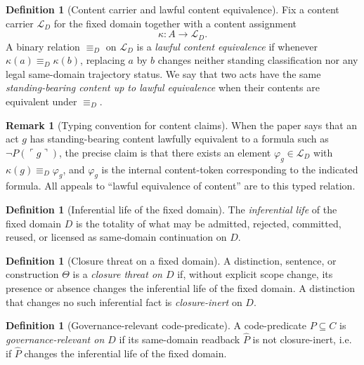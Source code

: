 \documentclass[11pt]{article}
\theoremstyle{plain}
\theoremstyle{definition}
\newtheorem{definition}[theorem]{Definition}
\newtheorem{remark}[theorem]{Remark}
\newcommand{\code}[1]{\ulcorner #1 \urcorner}
\newcommand{\domain}{D}
\begin{document}
\begin{definition}[Content carrier and lawful content equivalence]
Fix a content carrier $\mathcal{L}_{\domain}$ for the fixed domain together with a content assignment
\[
\kappa:A\to \mathcal{L}_{\domain}.
\]
A binary relation $\equiv_{\domain}$ on $\mathcal{L}_{\domain}$ is a \emph{lawful content equivalence} if whenever $\kappa(a)\equiv_{\domain}\kappa(b)$, replacing $a$ by $b$ changes neither standing classification nor any legal same-domain trajectory status. We say that two acts have the same \emph{standing-bearing content up to lawful equivalence} when their contents are equivalent under $\equiv_{\domain}$.
\end{definition}

\begin{remark}[Typing convention for content claims]
When the paper says that an act $g$ has standing-bearing content lawfully equivalent to a formula such as $\neg P(\code{g})$, the precise claim is that there exists an element $\varphi_g\in \mathcal{L}_{\domain}$ with $\kappa(g)\equiv_{\domain}\varphi_g$, and $\varphi_g$ is the internal content-token corresponding to the indicated formula. All appeals to ``lawful equivalence of content'' are to this typed relation.
\end{remark}

\begin{definition}[Inferential life of the fixed domain]
The \emph{inferential life} of the fixed domain $\domain$ is the totality of what may be admitted, rejected, committed, reused, or licensed as same-domain continuation on $\domain$.
\end{definition}

\begin{definition}[Closure threat on a fixed domain]
A distinction, sentence, or construction $\Theta$ is a \emph{closure threat on $\domain$} if, without explicit scope change, its presence or absence changes the inferential life of the fixed domain. A distinction that changes no such inferential fact is \emph{closure-inert} on $\domain$.
\end{definition}

\begin{definition}[Governance-relevant code-predicate]
A code-predicate $P\subseteq C$ is \emph{governance-relevant on $\domain$} if its same-domain readback $\widehat P$ is not closure-inert, i.e. if $\widehat P$ changes the inferential life of the fixed domain.
\end{definition}
\end{document}
